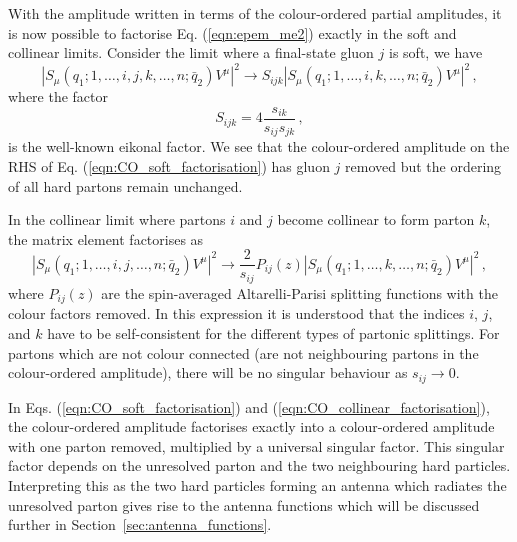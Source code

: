 \documentclass[main.tex]{subfiles}
\begin{document}
    With the amplitude written in terms of the colour-ordered
    partial amplitudes, it is now possible to factorise Eq. (\ref{eqn:epem_me2})
    exactly in the soft and collinear limits. Consider the limit where a final-state
    gluon $j$ is soft, we have
    \begin{equation}\label{eqn:CO_soft_factorisation}
        \left|S_{\mu}(q_{1};1,\ldots,i,j,k,\ldots,n;\bar{q}_{2})V^{\mu}\right|^{2} \rightarrow S_{ijk} \left|S_{\mu}(q_{1};1,\ldots,i,k,\ldots,n;\bar{q}_{2})V^{\mu}\right|^{2} \, ,
    \end{equation}
    where the factor
    \begin{equation}\label{eqn:eikonal_factor}
        S_{ijk} = 4\dfrac{s_{ik}}{s_{ij}s_{jk}} \, ,
    \end{equation}
    is the well-known eikonal factor. We see that the colour-ordered
    amplitude on the RHS of Eq. (\ref{eqn:CO_soft_factorisation}) has gluon $j$
    removed but the ordering of all hard partons remain unchanged.

    In the collinear limit where partons $i$ and $j$ become collinear
    to form parton $k$, the matrix element factorises as
    \begin{equation}\label{eqn:CO_collinear_factorisation}
        \left|S_{\mu}(q_{1};1,\ldots,i,j,\ldots,n;\bar{q}_{2})V^{\mu}\right|^{2} \rightarrow \dfrac{2}{s_{ij}}P_{ij}(z) \left|S_{\mu}(q_{1};1,\ldots,k,\ldots,n;\bar{q}_{2})V^{\mu}\right|^{2} \, ,
    \end{equation}
    where $P_{ij}(z)$ are the spin-averaged Altarelli-Parisi splitting
    functions with the colour factors removed.
    In this expression it is understood that the indices $i$, $j$, and $k$
    have to be self-consistent for the different types of partonic splittings.
    For partons which are not colour connected (are not neighbouring
    partons in the colour-ordered amplitude), there will be no singular
    behaviour as $s_{ij} \rightarrow 0$.

    In Eqs. (\ref{eqn:CO_soft_factorisation}) and (\ref{eqn:CO_collinear_factorisation}),
    the colour-ordered amplitude factorises exactly into a
    colour-ordered amplitude with one parton removed, multiplied
    by a universal singular factor. This singular factor depends on the unresolved
    parton and the two neighbouring hard particles. Interpreting this as
    the two hard particles forming an antenna which radiates the unresolved
    parton gives rise to the antenna functions which will be discussed
    further in Section~\ref{sec:antenna_functions}.
\end{document}

